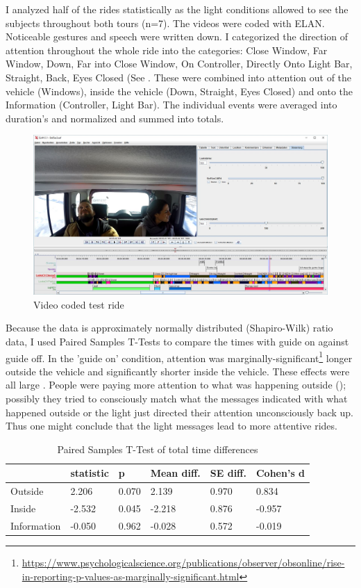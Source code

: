 I analyzed half of the rides statistically as the light conditions allowed to see the subjects throughout both tours (n=7). The videos were coded with ELAN\cite{Wittenburg2006ELAN:Research}. Noticeable gestures and speech were written down. I categorized the direction of attention throughout the whole ride into the categories: Close Window, Far Window, Down, Far into Close Window, On Controller, Directly Onto Light Bar, Straight, Back, Eyes Closed (See . These were combined into attention out of the vehicle (Windows), inside the vehicle (Down, Straight, Eyes Closed) and onto the Information (Controller, Light Bar). The individual events were averaged into duration's and normalized and summed into totals.
\begin{figure}
    \includegraphics[width=1\textwidth]{fig/StefSas.JPG}
    \caption[Video Coding]{Video coded test ride}
    \label{fig:videocode}
\end{figure}
Because the data is approximately normally distributed (Shapiro-Wilk) ratio data, I used Paired Samples T-Tests to compare the times with guide on against guide off. In the 'guide on' condition, attention was marginally-significant\footnote{\url{https://www.psychologicalscience.org/publications/observer/obsonline/rise-in-reporting-p-values-as-marginally-significant.html}} longer outside the vehicle and significantly shorter inside the vehicle. These effects were all large . People were paying more attention to what was happening outside (); possibly they tried to consciously match what the messages indicated with what happened outside or the light just directed their attention unconsciously back up. Thus one might conclude that the light messages lead to more attentive rides. 

\begin{table}[]
\label{tab:totalVideo}
  \caption{Paired Samples T-Test of total time differences}
\begin{tabular}{@{}llllll@{}}
\toprule
 & statistic &  p & Mean diff. & SE diff. & Cohen's d \\ \midrule
Outside & 2.206 &  0.070 & 2.139 & 0.970 & 0.834 \\
Inside & -2.532 &  0.045 & -2.218 & 0.876 & -0.957 \\
Information & -0.050 &  0.962 & -0.028 & 0.572 & -0.019 \\ \bottomrule
\end{tabular}
\end{table}

